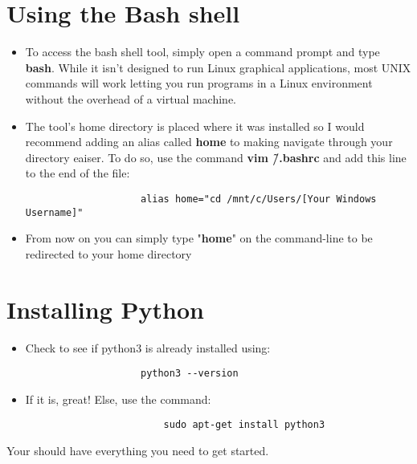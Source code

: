 \documentclass[12pt, titlepage]{article}
\begin{document}
	\section*{Using the Bash shell}
	
		\begin{itemize}				
				
			\item To access the bash shell tool, simply open a command prompt and type
			\textbf{bash}.  While it isn't designed to run Linux graphical applications, most
			UNIX commands will work letting you run programs in a Linux environment without
			the overhead of a virtual machine.  
			
			\item The tool's home directory is placed where it was installed so I would recommend
			adding an alias called \textbf{home} to making navigate through your directory
			eaiser.  To do so, use the command \textbf{vim \~/.bashrc} and add this line to
			the end of the file:
		
				\begin{verbatim}
					alias home="cd /mnt/c/Users/[Your Windows Username]"
				\end{verbatim}
		
			\item From now on you can simply type "\textbf{home}" on the command-line to be
			redirected to your home directory				
				
		\end{itemize}
					
	\section*{Installing Python}
				
		\begin{itemize}
			
			\item Check to see if python3 is already installed using:
				
				\begin{verbatim}
					python3 --version
				\end{verbatim}			
			
			\item If it is, great! Else, use the command:
					
					\begin{verbatim}
						sudo apt-get install python3
					\end{verbatim}		
			
		\end{itemize}
		
	Your should have everything you need to get started.		
			
	
\end{document}
